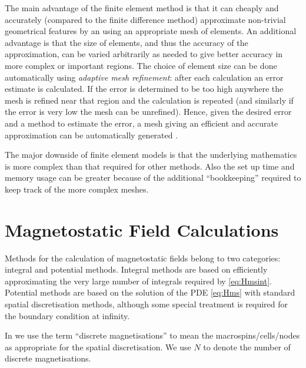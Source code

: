 The main advantage of the finite element method is that it can cheaply and accurately (compared to the finite difference method) approximate non-trivial geometrical features by an using an appropriate mesh of elements.
An additional advantage is that the size of elements, and thus the accuracy of the approximation, can be varied arbitrarily as needed to give better accuracy in more complex or important regions.
The choice of element size can be done automatically using \emph{adaptive mesh refinement}: after each calculation an error estimate is calculated.
If the error is determined to be too high anywhere the mesh is refined near that region and the calculation is repeated (and similarly if the error is very low the mesh can be unrefined).
Hence, given the desired error and a method to estimate the error, a mesh giving an efficient and accurate approximation can be automatically generated \cite{Schrefl1999}.

The major downside of finite element models is that the underlying mathematics is more complex than that required for other methods.
Also the set up time and memory usage can be greater because of the additional ``bookkeeping'' required to keep track of the more complex meshes.


\section{Magnetostatic Field Calculations}
\label{sec:magn-field-calc}

Methods for the calculation of magnetostatic fields belong to two categories: integral and potential methods.
Integral methods are based on efficiently approximating the very large number of integrals required by \cref{eq:Hmsint}.
Potential methods are based on the solution of the PDE \cref{eq:Hms} with standard spatial discretisation methods, although some special treatment is required for the boundary condition at infinity.

In  we use the term ``discrete magnetisations'' to mean the macrospins/cells/nodes as appropriate for the spatial discretisation.
We use $N$ to denote the number of discrete magnetisations.


